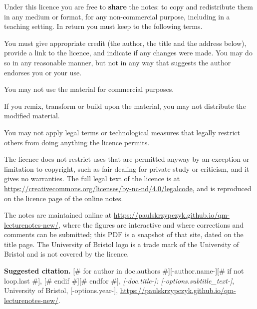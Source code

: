 \documentclass[11pt,oneside,openany]{book}
\theoremstyle{blacknumbox}
\let\qmtextbf\textbf
\renewcommand{\textbf}[1]{\qmtextbf{\textcolor{maincolor}{#1}}}
\begin{document}
\medskip\noindent Under this licence you are free to \textbf{share} the notes: to copy and redistribute them in any medium or format, for any non-commercial purpose, including in a teaching setting. In return you must keep to the following terms.
\begin{description}[leftmargin=4.3cm, style=sameline]
  \item[Attribution] You must give appropriate credit (the author, the title and the address below), provide a link to the licence, and indicate if any changes were made. You may do so in any reasonable manner, but not in any way that suggests the author endorses you or your use.
  \item[NonCommercial] You may not use the material for commercial purposes.
  \item[NoDerivatives] If you remix, transform or build upon the material, you may not distribute the modified material.
  \item[No further restrictions] You may not apply legal terms or technological measures that legally restrict others from doing anything the licence permits.
\end{description}
\noindent The licence does not restrict uses that are permitted anyway by an exception or limitation to copyright, such as fair dealing for private study or criticism, and it gives no warranties. The full legal text of the licence is at \url{https://creativecommons.org/licenses/by-nc-nd/4.0/legalcode}, and is reproduced on the licence page of the online notes.

\medskip\noindent The notes are maintained online at \url{https://paulskrzypczyk.github.io/qm-lecturenotes-new/}, where the figures are interactive and where corrections and comments can be submitted; this PDF is a snapshot of that site, dated on the title page. The University of Bristol logo is a trade mark of the University of Bristol and is not covered by the licence.

\medskip\noindent\textbf{Suggested citation.} [# for author in doc.authors #][-author.name-][# if not loop.last #], [# endif #][# endfor #], \emph{[-doc.title-]: [-options.subtitle_text-]}, University of Bristol, [-options.year-], \url{https://paulskrzypczyk.github.io/qm-lecturenotes-new/}.
\end{document}
